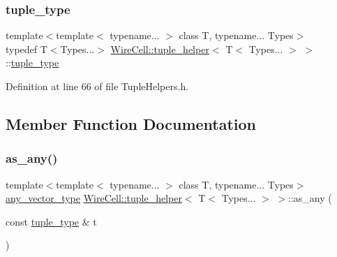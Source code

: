 \subsubsection{\texorpdfstring{tuple\+\_\+type}{tuple\_type}}
{\footnotesize\ttfamily template$<$template$<$ typename... $>$ class T, typename... Types$>$ \\
typedef T$<$Types...$>$ \hyperlink{struct_wire_cell_1_1tuple__helper}{Wire\+Cell\+::tuple\+\_\+helper}$<$ T$<$ Types... $>$ $>$\+::\hyperlink{struct_wire_cell_1_1tuple__helper_3_01_t_3_01_types_8_8_8_01_4_01_4_aef55cc988f5f41eff16f4a116bbd5fc5}{tuple\+\_\+type}}



Definition at line 66 of file Tuple\+Helpers.\+h.



\subsection{Member Function Documentation}
\mbox{\label{struct_wire_cell_1_1tuple__helper_3_01_t_3_01_types_8_8_8_01_4_01_4_a8f26063d1e734310dc6b733ace4a460f}} 
\subsubsection{\texorpdfstring{as\+\_\+any()}{as\_any()}}
{\footnotesize\ttfamily template$<$template$<$ typename... $>$ class T, typename... Types$>$ \\
\hyperlink{struct_wire_cell_1_1tuple__helper_3_01_t_3_01_types_8_8_8_01_4_01_4_a09d92f40f36eccfe85165e6ab93a6217}{any\+\_\+vector\+\_\+type} \hyperlink{struct_wire_cell_1_1tuple__helper}{Wire\+Cell\+::tuple\+\_\+helper}$<$ T$<$ Types... $>$ $>$\+::as\+\_\+any (\begin{DoxyParamCaption}\item[{const \hyperlink{struct_wire_cell_1_1tuple__helper_3_01_t_3_01_types_8_8_8_01_4_01_4_aef55cc988f5f41eff16f4a116bbd5fc5}{tuple\+\_\+type} \&}]{t }\end{DoxyParamCaption})\hspace{0.3cm}{\ttfamily [inline]}}

